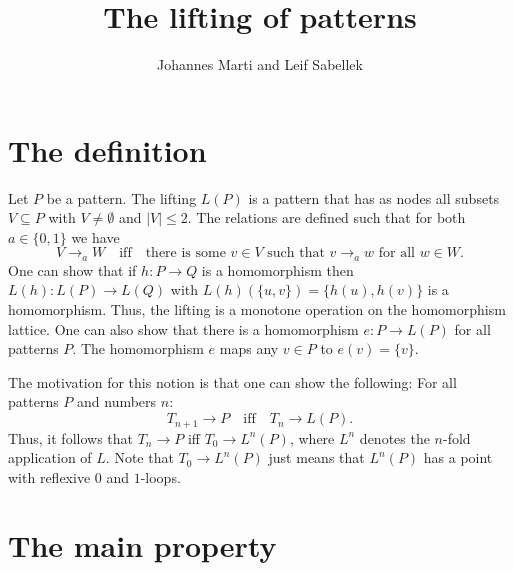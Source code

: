 \documentclass[a4paper]{article}
\title{The lifting of patterns}
\author{Johannes Marti and Leif Sabellek}
\renewcommand{\iff}{\quad \mbox{iff} \quad}
\begin{document}


\section{The definition}

Let $P$ be a pattern. The lifting $L(P)$ is a pattern that has as nodes
all subsets $V \subseteq P$ with $V \neq \emptyset$ and $|V| \leq 2$.
The relations are defined such that for both $a \in \{0,1\}$ we have
\[
 V \rightarrow_a W \iff \mbox{there is some } v \in V \mbox{ such that }
v \rightarrow_a w \mbox{ for all } w \in W.
\]
One can show that if $h : P \to Q$ is a homomorphism then $L(h) : L(P)
\to L(Q)$ with $L(h)(\{u,v\}) = \{h(u),h(v)\}$ is a homomorphism. Thus,
the lifting is a monotone operation on the homomorphism lattice. One can
also show that there is a homomorphism $e : P \to L(P)$ for all patterns
$P$. The homomorphism $e$ maps any $v \in P$ to $e(v) = \{v\}$.

The motivation for this notion is that one can show the following: For
all patterns $P$ and numbers $n$:
\begin{equation} \label{eq:lifting property}
 T_{n + 1} \to P \iff T_n \to L(P).
\end{equation}
Thus, it follows that $T_n \to P$ iff $T_0 \to L^n(P)$, where $L^n$
denotes the $n$-fold application of $L$. Note that $T_0 \to L^n(P)$ just
means that $L^n(P)$ has a point with reflexive $0$ and $1$-loops.


\section{The main property}
\end{document}
